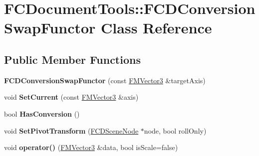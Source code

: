 \hypertarget{classFCDocumentTools_1_1FCDConversionSwapFunctor}{
\section{FCDocumentTools::FCDConversionSwapFunctor Class Reference}
\label{classFCDocumentTools_1_1FCDConversionSwapFunctor}
}
\subsection*{Public Member Functions}
\begin{DoxyCompactItemize}
\item 
\hypertarget{classFCDocumentTools_1_1FCDConversionSwapFunctor_a101c31762b7b03375a90241e8af2d3b2}{
{\bfseries FCDConversionSwapFunctor} (const \hyperlink{classFMVector3}{FMVector3} \&targetAxis)}
\label{classFCDocumentTools_1_1FCDConversionSwapFunctor_a101c31762b7b03375a90241e8af2d3b2}

\item 
\hypertarget{classFCDocumentTools_1_1FCDConversionSwapFunctor_af59f7914484fc9af271b8f2ca5460ac3}{
void {\bfseries SetCurrent} (const \hyperlink{classFMVector3}{FMVector3} \&axis)}
\label{classFCDocumentTools_1_1FCDConversionSwapFunctor_af59f7914484fc9af271b8f2ca5460ac3}

\item 
\hypertarget{classFCDocumentTools_1_1FCDConversionSwapFunctor_a88ab9273b9cea87eff129b50c8cf14cb}{
bool {\bfseries HasConversion} ()}
\label{classFCDocumentTools_1_1FCDConversionSwapFunctor_a88ab9273b9cea87eff129b50c8cf14cb}

\item 
\hypertarget{classFCDocumentTools_1_1FCDConversionSwapFunctor_a9b1ed0ac0a4d9eee6d5b5209ca2ad4bf}{
void {\bfseries SetPivotTransform} (\hyperlink{classFCDSceneNode}{FCDSceneNode} $\ast$node, bool rollOnly)}
\label{classFCDocumentTools_1_1FCDConversionSwapFunctor_a9b1ed0ac0a4d9eee6d5b5209ca2ad4bf}

\item 
\hypertarget{classFCDocumentTools_1_1FCDConversionSwapFunctor_aa01c7004fb61542e20d0d0d93bae3795}{
void {\bfseries operator()} (\hyperlink{classFMVector3}{FMVector3} \&data, bool isScale=false)}
\label{classFCDocumentTools_1_1FCDConversionSwapFunctor_aa01c7004fb61542e20d0d0d93bae3795}

\end{DoxyCompactItemize}
